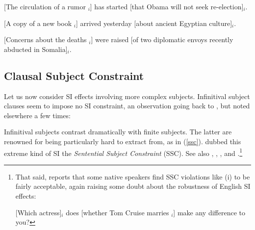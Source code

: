 \documentclass[output=paper
                ,modfonts
                ,nonflat
	        ,collection
	        ,collectionchapter
	        ,collectiontoclongg
 	        ,biblatex
                ,babelshorthands
                ,newtxmath
                ,draftmode
                ,colorlinks, citecolor=brown
]{./langsci/langscibook}
\begin{document}
\eal \label{subxxx}
\ex {}[The circulation of a rumor \spc$_i$]
has started [that Obama will not seek re-election]$_i$.

\ex {}[A  copy of a new book \spc$_i$] arrived
yesterday [about ancient Egyptian culture]$_i$.

\ex {}[Concerns about the deaths  \spc$_i$] were
raised [of two diplomatic envoys recently abducted in Somalia]$_i$.
\zl


\subsection{Clausal Subject Constraint}

Let us now consider SI effects involving more complex subjects.
Infinitival subject clauses seem to impose no SI constraint, an observation going
back to \citet{kunotakamib}, but noted elsewhere a few times:

\eal \label{vpsi}


\zl




\noindent
Infinitival subjects contrast dramatically with finite  subjects. The latter are renowned for being particularly hard to extract from,  as in  (\ref{ssc}).
  \citet{Ross67} dubbed this extreme kind of SI the  \emph{Sentential Subject Constraint} (SSC). See also  \citet{chomsky73}, \citet{huang82},  \citet{Chomsky86b}, and \citet{freidin92}.\footnote{That said, \citet{chavessubj} reports that some native speakers find SSC violations like  (i) to be fairly acceptable, again raising some doubt about the robustness of English SI effects:

\ea
{}[Which actress]$_i$ does [whether Tom Cruise marries \spc$_i$] make any difference to you?
\zlast
}


\eal \label{ssc}
\end{document}
